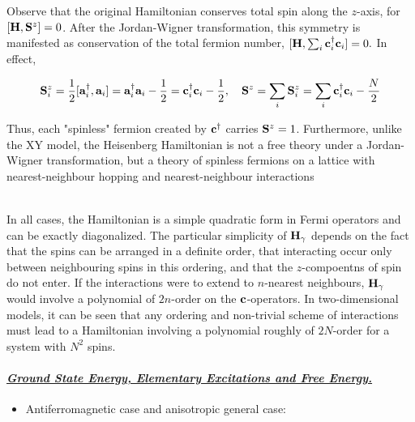 \documentclass{homework}
\begin{document}
\begin{tcolorbox}[colback = yellow, title = Physical Context]

Observe that the original Hamiltonian conserves total spin along the $z$-axis, for $[{\bf H}, {\bf S}^z] = 0$. After the Jordan-Wigner transformation, this symmetry is manifested as conservation of the total fermion number, $[{\bf H}, \sum_{i} {\bf c}_i^\dagger {\bf c}_i] = 0.$ 
In effect, 

\begin{equation}
    \begin{split}
        {\bf S}_i^z = \frac{1}{2} [{\bf a}_i^\dagger, {\bf a}_i] = {\bf a}_i^\dagger {\bf a}_i - \frac{1}{2} = {\bf c}_i^\dagger {\bf c}_i - \frac{1}{2}, \quad 
        {\bf S}^z = \sum_{i} {\bf S}_i^z = \sum_{i} {\bf c}_i^\dagger {\bf c}_i - \frac{N}{2}
    \end{split}
\end{equation}

Thus, each "spinless" fermion created by ${\bf c}^\dagger$ carries ${\bf S}^z = 1$. Furthermore, unlike the XY model, the Heisenberg Hamiltonian is not a free theory under a Jordan-Wigner transformation, but a theory of spinless fermions on a lattice with nearest-neighbour hopping and nearest-neighbour interactions 
\end{tcolorbox}

\blanky \\ 

In all cases, the Hamiltonian is a simple quadratic form in Fermi operators and can be exactly diagonalized. The particular simplicity of ${\bf H}_{\gamma}$ depends on the fact that the spins can be arranged in a definite order, that interacting occur only between neighbouring spins in this ordering, and that the $z$-compoentns of spin do not enter. If the interactions were to extend to $n$-nearest neighbours, ${\bf H}_{\gamma}$ would involve a polynomial of $2n$-order on the ${\bf c}$-operators. In two-dimensional models, it can be seen that any ordering and non-trivial scheme of interactions must lead to a Hamiltonian involving a polynomial roughly of $2N$-order for a system with $N^2$
spins. 

\clearpage

\paragraph{\textit{\underline{Ground State Energy, Elementary Excitations and Free Energy. }}} 

\begin{itemize}
    \item Antiferromagnetic case and anisotropic general case:
\end{itemize}
\end{document}
